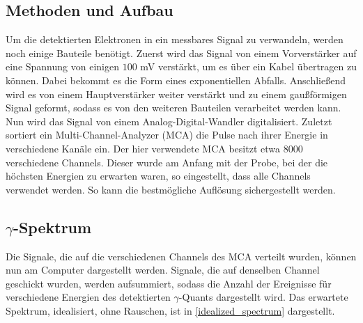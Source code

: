 \subsection{Methoden und Aufbau}
Um die detektierten Elektronen in ein messbares Signal zu verwandeln, werden noch einige Bauteile benötigt. Zuerst wird das Signal von einem Vorverstärker auf eine Spannung von einigen $100$ mV verstärkt, um es über ein Kabel übertragen zu können. Dabei bekommt es die Form eines exponentiellen Abfalls. Anschließend wird es von einem Hauptverstärker weiter verstärkt und zu einem gaußförmigen Signal geformt, sodass es von den weiteren Bauteilen verarbeitet werden kann. Nun wird das Signal von einem Analog-Digital-Wandler digitalisiert. Zuletzt sortiert ein Multi-Channel-Analyzer (MCA) die Pulse nach ihrer Energie in verschiedene Kanäle ein. Der hier verwendete MCA besitzt etwa $8000$ verschiedene Channels. Dieser wurde am Anfang mit der Probe, bei der die höchsten Energien zu erwarten waren, so eingestellt, dass alle Channels verwendet werden. So kann die bestmögliche Auflösung sichergestellt werden.

\subsection{$\gamma$-Spektrum}
Die Signale, die auf die verschiedenen Channels des MCA verteilt wurden, können nun am Computer dargestellt werden. Signale, die auf denselben Channel geschickt wurden, werden aufsummiert, sodass die Anzahl der Ereignisse für verschiedene Energien des detektierten $\gamma$-Quants dargestellt wird. Das erwartete Spektrum, idealisiert, ohne Rauschen, ist in \cref{idealized_spectrum} dargestellt.

